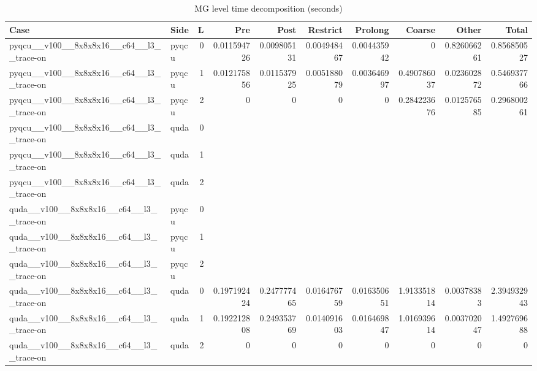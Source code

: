 
\begin{table}[htbp]
\centering
\caption{MG level time decomposition (seconds)}
\small
\begin{tabular}{@{}llrrrrrrrr@{}}
\toprule
Case & Side & L & Pre & Post & Restrict & Prolong & Coarse & Other & Total \\
\midrule
pyqcu\_\_v100\_\_8x8x8x16\_\_c64\_\_l3\_\_trace-on & pyqcu & 0 & 0.011594726 & 0.009805131 & 0.004948467 & 0.004435942 & 0 & 0.826066261 & 0.856850527 \\
pyqcu\_\_v100\_\_8x8x8x16\_\_c64\_\_l3\_\_trace-on & pyqcu & 1 & 0.012175856 & 0.011537925 & 0.005188079 & 0.003646997 & 0.490786037 & 0.023602872 & 0.546937766 \\
pyqcu\_\_v100\_\_8x8x8x16\_\_c64\_\_l3\_\_trace-on & pyqcu & 2 & 0 & 0 & 0 & 0 & 0.284223676 & 0.012576585 & 0.296800261 \\
pyqcu\_\_v100\_\_8x8x8x16\_\_c64\_\_l3\_\_trace-on & quda & 0 &  &  &  &  &  &  &  \\
pyqcu\_\_v100\_\_8x8x8x16\_\_c64\_\_l3\_\_trace-on & quda & 1 &  &  &  &  &  &  &  \\
pyqcu\_\_v100\_\_8x8x8x16\_\_c64\_\_l3\_\_trace-on & quda & 2 &  &  &  &  &  &  &  \\
quda\_\_v100\_\_8x8x8x16\_\_c64\_\_l3\_\_trace-on & pyqcu & 0 &  &  &  &  &  &  &  \\
quda\_\_v100\_\_8x8x8x16\_\_c64\_\_l3\_\_trace-on & pyqcu & 1 &  &  &  &  &  &  &  \\
quda\_\_v100\_\_8x8x8x16\_\_c64\_\_l3\_\_trace-on & pyqcu & 2 &  &  &  &  &  &  &  \\
quda\_\_v100\_\_8x8x8x16\_\_c64\_\_l3\_\_trace-on & quda & 0 & 0.197192424 & 0.247777465 & 0.016476759 & 0.016350651 & 1.913351814 & 0.00378383 & 2.394932943 \\
quda\_\_v100\_\_8x8x8x16\_\_c64\_\_l3\_\_trace-on & quda & 1 & 0.192212808 & 0.249353769 & 0.014091603 & 0.016469847 & 1.016939614 & 0.003702047 & 1.492769688 \\
quda\_\_v100\_\_8x8x8x16\_\_c64\_\_l3\_\_trace-on & quda & 2 & 0 & 0 & 0 & 0 & 0 & 0 & 0 \\
\bottomrule
\end{tabular}
\end{table}

